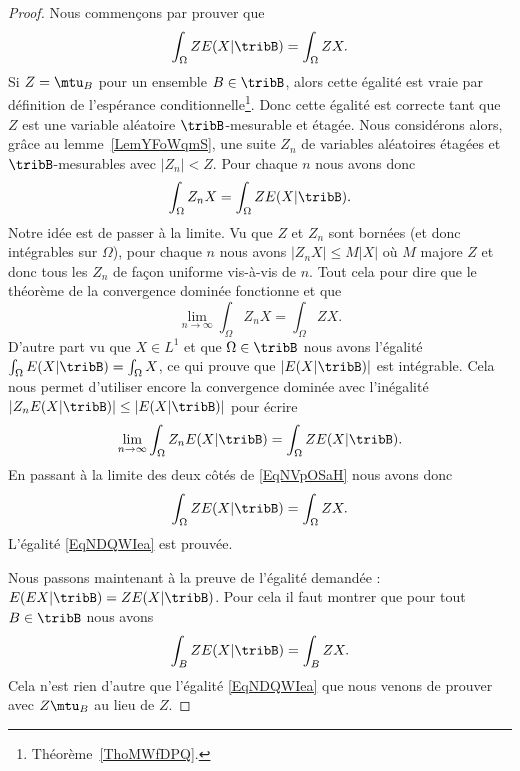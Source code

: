 \begin{proof}
    Nous commençons par prouver que
    \begin{equation}    \label{EqNDQWIea}
        \int_{\Omega}ZE(X|\tribB)=\int_{\Omega}ZX.
    \end{equation}
    Si \( Z=\mtu_B\) pour un ensemble \( B\in\tribB\), alors cette égalité est vraie par définition de l'espérance conditionnelle\footnote{Théorème~\ref{ThoMWfDPQ}.}. Donc cette égalité est correcte tant que \( Z\) est une variable aléatoire \( \tribB\)-mesurable et étagée. Nous considérons alors, grâce au lemme~\ref{LemYFoWqmS}, une suite \( Z_n\) de variables aléatoires étagées et \( \tribB\)-mesurables avec \( | Z_n |<Z\). Pour chaque \( n\) nous avons donc
    \begin{equation}    \label{EqNVpOSaH}
        \int_{\Omega}Z_nX=\int_{\Omega}ZE(X|\tribB).
    \end{equation}
    Notre idée est de passer à la limite. Vu que \( Z\) et \( Z_n\) sont bornées (et donc intégrables sur \( \Omega\)), pour chaque \( n\) nous avons \( | Z_nX |\leq M| X |\) où \( M\) majore \( Z\) et donc tous les \( Z_n\) de façon uniforme vis-à-vis de \( n\). Tout cela pour dire que le théorème de la convergence dominée fonctionne et que
    \begin{equation}
        \lim_{n\to \infty} \int_{\Omega}Z_nX=\int_{\Omega}ZX.
    \end{equation}
    D'autre part vu que \( X\in L^1\) et que \( \Omega\in\tribB\) nous avons l'égalité \( \int_{\Omega}E(X|\tribB)=\int_{\Omega}X\), ce qui prouve que \( | E(X|\tribB) | \) est intégrable. Cela nous permet d'utiliser encore la convergence dominée avec l'inégalité \( | Z_nE(X|\tribB) |\leq | E(X|\tribB) |\) pour écrire
    \begin{equation}
        \lim_{n\to \infty} \int_{\Omega}Z_nE(X|\tribB)=\int_{\Omega}ZE(X|\tribB).
    \end{equation}
    En passant à la limite des deux côtés de \eqref{EqNVpOSaH} nous avons donc
    \begin{equation}
        \int_{\Omega}ZE(X|\tribB)=\int_{\Omega}ZX.
    \end{equation}
    L'égalité \eqref{EqNDQWIea} est prouvée.

    Nous passons maintenant à la preuve de l'égalité demandée : \( E(EX|\tribB)=ZE(X|\tribB)\). Pour cela il faut montrer que pour tout \( B\in\tribB\) nous avons
    \begin{equation}
        \int_{B}ZE(X|\tribB)=\int_BZX.
    \end{equation}
    Cela n'est rien d'autre que l'égalité \eqref{EqNDQWIea} que nous venons de prouver avec \( Z\mtu_{B}\) au lieu de \( Z\).
\end{proof}

